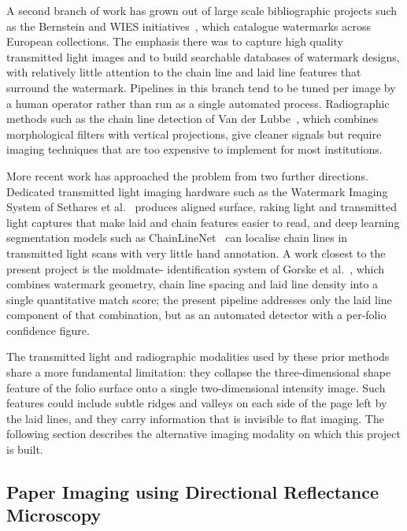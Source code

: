 A second branch of work has grown out of large scale bibliographic
projects such as the Bernstein and WIES
initiatives~\cite{wenger2010bernstein,wies}, which catalogue watermarks
across European collections. The emphasis there was to capture
high quality transmitted light images and to build searchable
databases of watermark designs, with relatively little attention to
the chain line and laid line features that surround the watermark.
Pipelines in this branch tend to be tuned per image by a human
operator rather than run as a single automated process. Radiographic
methods such as the chain line detection of Van der
Lubbe~\cite{vanderlubbe2001rembrandt}, which combines morphological filters
with vertical projections, give cleaner signals but require imaging techniques
that are too expensive to implement for most institutions.

More recent work has approached the problem from two further
directions. Dedicated transmitted light imaging hardware such as
the Watermark Imaging System of Sethares et
al.~\cite{sethares2023wimsy} produces aligned surface, raking light
and transmitted light captures that make laid and chain features
easier to read, and deep learning segmentation models such as
ChainLineNet~\cite{sindel2021chainlinenet} can localise chain lines
in transmitted light scans with very little hand annotation.
A work closest to the present project is the moldmate-
identification system of Gorske et al.~\cite{gorske2021moldmate},
which combines watermark geometry, chain line spacing and laid line
density into a single quantitative match score; the present
pipeline addresses only the laid line component of that
combination, but as an automated detector with a per-folio
confidence figure.

The transmitted light and radiographic modalities used by these prior
methods share a more fundamental limitation: they collapse the
three-dimensional shape feature of the folio surface onto a single
two-dimensional intensity image. Such features could include subtle ridges and valleys on each side of the page left by the laid lines, and they
carry information that is invisible to flat imaging. The
following section describes the alternative imaging modality on which
this project is built.

\subsection{Paper Imaging using Directional Reflectance Microscopy}
\label{sec:bg:drm}

